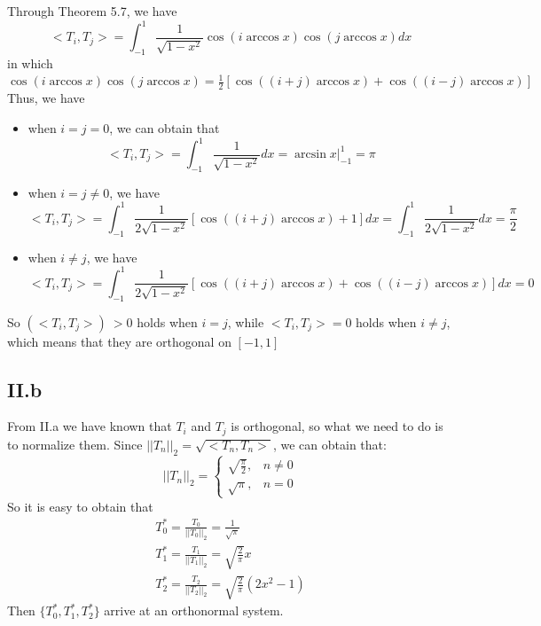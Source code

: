 \documentclass[a4paper]{article}
\begin{document}
Through Theorem 5.7, we have
\begin{equation}
  <T_i,T_j>=\int_{-1}^1 \frac{1}{\sqrt{1-x^2}} \cos (i\arccos x) \cos(j \arccos x)dx
\end{equation}
in which $\cos (i\arccos x) \cos(j \arccos x)=\frac{1}{2}[\cos((i+j)\arccos x)+\cos((i-j) \arccos x)]$
Thus, we have 
\begin{itemize}
  \item when $i=j=0$, we can obtain that
  \begin{equation}
    <T_i,T_j>=\int_{-1}^1\frac{1}{\sqrt{1-x^2}}dx=\arcsin x\big|_{-1}^1=\pi
  \end{equation}
  \item when $i=j\neq 0$, we have 
  \begin{equation}
    <T_i,T_j>=\int_{-1}^1\frac{1}{2\sqrt{1-x^2}}[\cos((i+j)\arccos x)+1]dx=\int_{-1}^1\frac{1}{2\sqrt{1-x^2}}dx=\frac{\pi}{2}
  \end{equation}
  \item when $i\neq j$, we have
  \begin{equation}
    <T_i,T_j>=\int_{-1}^1\frac{1}{2\sqrt{1-x^2}}[\cos((i+j)\arccos x)+\cos((i-j)\arccos x)]dx=0
  \end{equation}   
\end{itemize}
So $(<T_i,T_j>)\ >0$ holds when $i=j$, while $<T_i,T_j>=0$ holds when $i\neq j$, which means that they are orthogonal on $[-1,1]$


\subsection*{II.b}

From II.a we have known that $T_i$ and $T_j$ is orthogonal, so what we need to do is to normalize them.
Since $||T_n||_2=\sqrt{<T_n,T_n>}$, we can obtain that:
\begin{equation}
  ||T_n||_2=\begin{cases}
    \sqrt{\frac{\pi}{2}},&n\neq 0\\
    \sqrt{\pi}, & n=0
  \end{cases}
\end{equation}
So it is easy to obtain that
\begin{align}
  T_0^*=\frac{T_0}{||T_0||_2}=\frac{1}{\sqrt{\pi}} \label{eq:T0} \\ 
  T_1^{*}=\frac{T_1}{||T_1||_2}=\sqrt{\frac{2}{\pi}}x \label{eq:T1} \\ 
  T_2^{*}=\frac{T_2}{||T_2||_2}=\sqrt{\frac{2}{\pi}}(2x^2-1) \label{eq:T2}
\end{align}
Then $\{T_0^*,T_1^*,T_2^*\}$ arrive at an orthonormal system.
\end{document}
